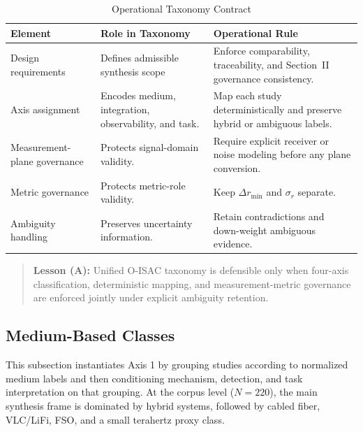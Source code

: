 \begin{table}[!t]
\caption{Operational Taxonomy Contract}
\label{tab:taxonomy-contract}
\centering
\footnotesize
\setlength{\tabcolsep}{4pt}
\begin{tabularx}{\textwidth}{p{}p{}X}
\toprule
\textbf{Element} & \textbf{Role in Taxonomy} & \textbf{Operational Rule} \\
\midrule
Design requirements & Defines admissible synthesis scope & Enforce comparability, traceability, and Section~II governance consistency. \\
Axis assignment & Encodes medium, integration, observability, and task. & Map each study deterministically and preserve hybrid or ambiguous labels. \\
Measurement-plane governance & Protects signal-domain validity. & Require explicit receiver or noise modeling before any plane conversion. \\
Metric governance & Protects metric-role validity. & Keep $\Delta r_{\min}$ and $\sigma_r$ separate. \\
Ambiguity handling & Preserves uncertainty information. & Retain contradictions and down-weight ambiguous evidence. \\
\bottomrule
\end{tabularx}
\end{table}

\begin{quote}
\textbf{Lesson (A):} Unified O-ISAC taxonomy is defensible only when four-axis classification, deterministic mapping, and measurement-metric governance are enforced jointly under explicit ambiguity retention.
\end{quote}

\subsection{Medium-Based Classes}
This subsection instantiates Axis 1 by grouping studies according to normalized medium labels and then conditioning mechanism, detection, and task interpretation on that grouping. At the corpus level ($N=220$), the main synthesis frame is dominated by hybrid systems, followed by cabled fiber, VLC/LiFi, FSO, and a small terahertz proxy class.

